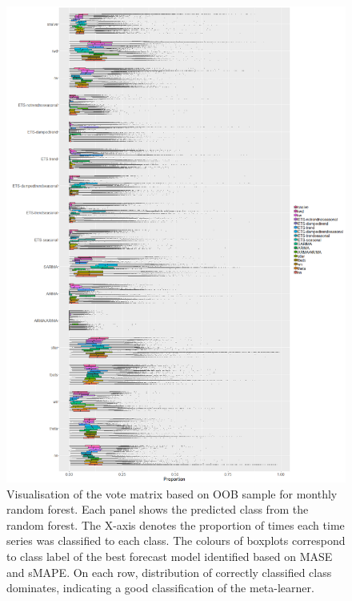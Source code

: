 \documentclass[11pt,a4paper,]{article}
\begin{document}
\begin{figure}
\centering
\includegraphics{figures/oobmonthly-1.png}
\caption{\label{fig:oobmonthly}Visualisation of the vote matrix based on OOB sample for monthly random forest. Each panel shows the predicted class from the random forest. The X-axis denotes the proportion of times each time series was classified to each class. The colours of boxplots correspond to class label of the best forecast model identified based on MASE and sMAPE. On each row, distribution of correctly classified class dominates, indicating a good classification of the meta-learner.}
\end{figure}
\end{document}
